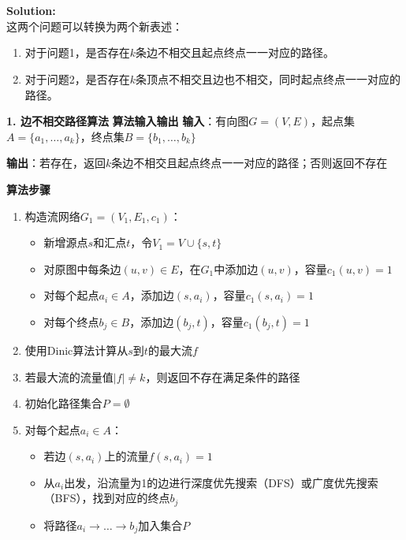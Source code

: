 \documentclass{article}
\newcounter{exercise}
\newcommand{\<}{
    \langle}
\renewcommand{\>}{
    \rangle}
\begin{document}
{\begin{exercise}
\begin{itemize}
\end{itemize}


\end{exercise}
\\\\
\noindent\textbf{Solution:}
\\
这两个问题可以转换为两个新表述：
\begin{enumerate}
    \item 对于问题1，是否存在$k$条边不相交且起点终点一一对应的路径。
    \item 对于问题2，是否存在$k$条顶点不相交且边也不相交，同时起点终点一一对应的路径。
\end{enumerate}


\noindent\textbf{1. 边不相交路径算法}
\noindent\textbf{算法输入输出}
\textbf{输入}：有向图$G=(V,E)$，起点集$A=\{a_1,\dots,a_k\}$，终点集$B=\{b_1,\dots,b_k\}$

\textbf{输出}：若存在，返回$k$条边不相交且起点终点一一对应的路径；否则返回不存在

\noindent\textbf{算法步骤}
\begin{enumerate}
    \item 构造流网络$G_1=(V_1,E_1,c_1)$：
    \begin{itemize}
        \item 新增源点$s$和汇点$t$，令$V_1 = V \cup \{s, t\}$
        \item 对原图中每条边$(u,v) \in E$，在$G_1$中添加边$(u,v)$，容量$c_1(u,v)=1$
        \item 对每个起点$a_i \in A$，添加边$(s,a_i)$，容量$c_1(s,a_i)=1$
        \item 对每个终点$b_j \in B$，添加边$(b_j,t)$，容量$c_1(b_j,t)=1$
    \end{itemize}
    
    \item 使用Dinic算法计算从$s$到$t$的最大流$f$
    
    \item 若最大流的流量值$|f| \neq k$，则返回不存在满足条件的路径
    
    \item 初始化路径集合$P = \emptyset$
    
    \item 对每个起点$a_i \in A$：
    \begin{itemize}
        \item 若边$(s,a_i)$上的流量$f(s,a_i) = 1$
        \item 从$a_i$出发，沿流量为1的边进行深度优先搜索（DFS）或广度优先搜索（BFS），找到对应的终点$b_j$
        \item 将路径$a_i \to \dots \to b_j$加入集合$P$
    \end{itemize}
    

\end{enumerate}}
\end{document}
